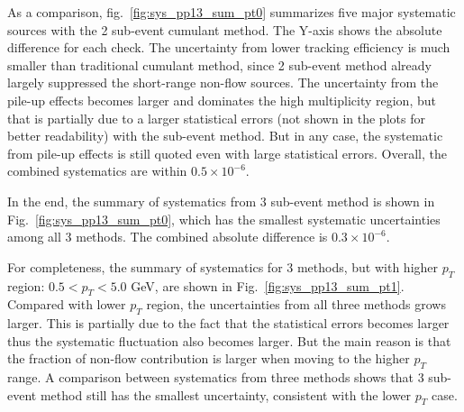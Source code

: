 As a comparison, fig.~\ref{fig:sys_pp13_sum_pt0} summarizes five major systematic sources with the 2 sub-event cumulant method. The Y-axis shows the absolute difference for each check. The uncertainty from lower tracking efficiency is much smaller than traditional cumulant method, since 2 sub-event method already largely suppressed the short-range non-flow sources. The uncertainty from the pile-up effects becomes larger and dominates the high multiplicity region, but that is partially due to a larger statistical errors (not shown in the plots for better readability) with the sub-event method. But in any case, the systematic from pile-up effects is still quoted even with large statistical errors. Overall, the combined systematics are within $0.5\times 10^{-6}$.

In the end, the summary of systematics from 3 sub-event method is shown in Fig.~\ref{fig:sys_pp13_sum_pt0}, which has the smallest systematic uncertainties among all 3 methods. The combined absolute difference is $0.3\times 10^{-6}$.

For completeness, the summary of systematics for 3 methods, but with higher $p_{T}$ region: $0.5<p_{T}<5.0$ GeV, are shown in Fig.~\ref{fig:sys_pp13_sum_pt1}. Compared with lower $p_{T}$ region, the uncertainties from all three methods grows larger. This is partially due to the fact that the statistical errors becomes larger thus the systematic fluctuation also becomes larger. But the main reason is that the fraction of non-flow contribution is larger when moving to the higher $p_{T}$ range. A comparison between systematics from three methods shows that 3 sub-event method still has the smallest uncertainty, consistent with the lower $p_{T}$ case.

